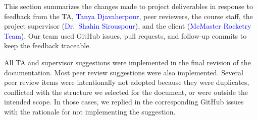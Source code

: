 \documentclass{article}
\begin{document}
This section summarizes the changes made to project deliverables in response to
feedback from the TA, \textcolor{blue}{Tanya Djavaherpour}, peer reviewers, the
course staff, the project supervisor (\textcolor{blue}{Dr.~Shahin
Sirouspour}), and the client (\textcolor{blue}{McMaster Rocketry Team}). Our team used
GitHub issues, pull requests, and follow-up commits to keep the feedback
traceable.

All TA and supervisor suggestions were implemented in the final revision of the
documentation. Most peer review suggestions were also implemented. Several
peer review items were intentionally not adopted because they were
duplicates, conflicted with the structure we selected for the document, or were
outside the intended scope. In those cases, we replied in the corresponding
GitHub issues with the rationale for not implementing the suggestion.
\end{document}
